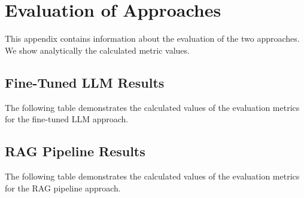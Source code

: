 \chapter{Evaluation of Approaches}

This appendix contains information about the evaluation of the two approaches. We show analytically the calculated metric values.


\section{Fine-Tuned LLM Results}

The following table demonstrates the calculated values of the evaluation metrics for the fine-tuned LLM approach.


\begin{table}[h!]
    \centering
    \caption{Evaluation metrics across different training epochs}
    \label{tab:results_ft}
\end{table}



\section{RAG Pipeline Results}

The following table demonstrates the calculated values of the evaluation metrics for the RAG pipeline approach.

\begin{table}[h!]
    \centering
    \caption{Evaluation metrics across different approaches}
    \label{tab:results_rag}
\end{table}


